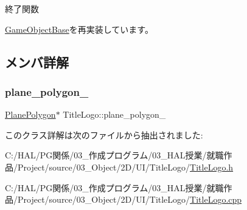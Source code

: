 終了関数 



\mbox{\hyperlink{class_game_object_base_a97e1bc277d7b1c0156d4735de29a022c}{Game\+Object\+Base}}を再実装しています。



\subsection{メンバ詳解}
\mbox{\label{class_title_logo_a842ef60ff79632e1dad76599952eb95a}} 
\subsubsection{\texorpdfstring{plane\+\_\+polygon\+\_\+}{plane\_polygon\_}}
{\footnotesize\ttfamily \mbox{\hyperlink{class_plane_polygon}{Plane\+Polygon}}$\ast$ Title\+Logo\+::plane\+\_\+polygon\+\_\+}



このクラス詳解は次のファイルから抽出されました\+:\begin{DoxyCompactItemize}
\item 
C\+:/\+H\+A\+L/\+P\+G関係/03\+\_\+作成プログラム/03\+\_\+\+H\+A\+L授業/就職作品/\+Project/source/03\+\_\+\+Object/2\+D/\+U\+I/\+Title\+Logo/\mbox{\hyperlink{_title_logo_8h}{Title\+Logo.\+h}}\item 
C\+:/\+H\+A\+L/\+P\+G関係/03\+\_\+作成プログラム/03\+\_\+\+H\+A\+L授業/就職作品/\+Project/source/03\+\_\+\+Object/2\+D/\+U\+I/\+Title\+Logo/\mbox{\hyperlink{_title_logo_8cpp}{Title\+Logo.\+cpp}}\end{DoxyCompactItemize}
